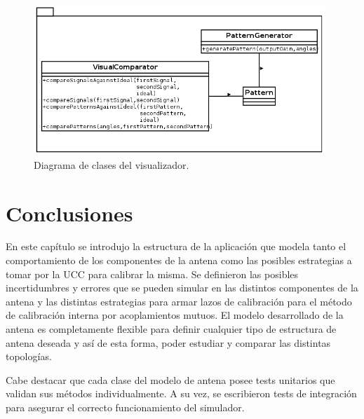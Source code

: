 \begin{figure}[H]
 \centering
 \includegraphics[width=11cm]{gfx/visualPackage.png}
 \caption{Diagrama de clases del visualizador.}
 \label{fig:visualPackage}
\end{figure}


\section{Conclusiones}

En este capítulo se introdujo la estructura de la aplicación que modela tanto el comportamiento de los componentes de la antena
como las posibles estrategias a tomar por la UCC para calibrar la misma. Se definieron las posibles incertidumbres y errores que
se pueden simular en las distintos componentes de la antena y las distintas estrategias para armar lazos de calibración para el 
método de calibración interna por acoplamientos mutuos. El modelo desarrollado de la antena es completamente flexible para
definir cualquier tipo de estructura de antena deseada y así de esta forma, poder estudiar y comparar las distintas topologías. 

Cabe destacar que cada clase del modelo de antena posee tests unitarios que validan sus métodos individualmente. A su vez, se
escribieron tests de integración para asegurar el correcto funcionamiento del simulador.


